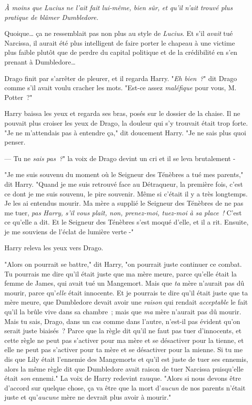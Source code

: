 \emph{À moins que Lucius ne l'ait fait lui-même, bien sûr, et qu'il n'ait trouvé plus pratique de blâmer Dumbledore.}

Quoique… ça ne ressemblait pas non plus au style de \emph{Lucius}. Et s'il \emph{avait} tué Narcissa, il aurait été plus intelligent de faire porter le chapeau à une victime plus faible plutôt que de perdre du capital politique et de la crédibilité en s'en prenant à Dumbledore…

Drago finit par s'arrêter de pleurer, et il regarda Harry. "\emph{Eh bien~?}" dit Drago comme s'il avait voulu cracher les mots. "Est-ce assez \emph{maléfique} pour vous, M. Potter~?"

Harry baissa les yeux et regarda ses bras, posés sur le dossier de la chaise. Il ne pouvait plus croiser les yeux de Drago, la douleur qui s'y trouvait était trop forte. "Je ne m'attendais pas à entendre ça," dit doucement Harry. "Je ne sais plus quoi penser.

--- Tu ne \emph{sais pas~?}" la voix de Drago devint un cri et il se leva brutalement -

"Je me suis souvenu du moment où le Seigneur des Ténèbres a tué mes parents," dit Harry. "Quand je me suis retrouvé face au Détraqueur, la première fois, c'est ce dont je me suis souvenu, le pire souvenir. Même si c'était il y a très longtemps. Je les ai entendus mourir. Ma mère a supplié le Seigneur des Ténèbres de ne pas me tuer, \emph{pas Harry, s'il vous plaît, non, prenez-moi, tuez-moi à sa place~!} C'est ce qu'elle a dit. Et le Seigneur des Ténèbres s'est moqué d'elle, et il a rit. Ensuite, je me souviens de l'éclat de lumière verte -"

Harry releva les yeux vers Drago.

"Alors on pourrait se battre," dit Harry, "on pourrait juste continuer ce combat. Tu pourrais me dire qu'il était juste que ma mère meure, parce qu'elle était la femme de James, qui avait tué un Mangemort. Mais que \emph{ta} mère n'aurait pas dû mourir, parce qu'\emph{elle} était innocente. Et je pourrais te dire qu'il était juste que ta mère meure, que Dumbledore devait avoir une \emph{raison} qui rendait \emph{acceptable} le fait qu'il la brûle vive dans sa chambre~; mais que \emph{ma} mère n'aurait pas dû mourir. Mais tu sais, Drago, dans un cas comme dans l'autre, n'est-il pas évident qu'on serait juste biaisés~? Parce que la règle dit qu'il ne faut pas tuer d'innocents, et cette règle ne peut pas s'activer pour ma mère et se désactiver pour la tienne, et elle ne peut pas s'activer pour ta mère et se désactiver pour la mienne. Si tu me dis que Lily était l'ennemie des Mangemorts et qu'il est juste de tuer ses ennemis, alors la même règle dit que Dumbledore avait raison de tuer Narcissa puisqu'elle était \emph{son} ennemi." La voix de Harry redevint rauque. "Alors si nous devons être d'accord sur quelque chose, ça va être que la mort d'\emph{aucun} de nos parents n'était juste et qu'\emph{aucune} mère ne devrait plus avoir à mourir."


